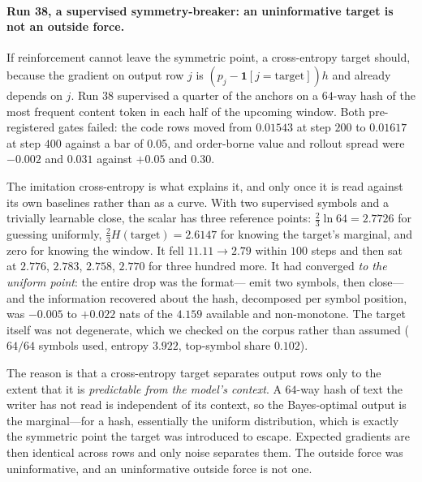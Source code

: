 \documentclass{article} %
\begin{document}
\paragraph{Run 38, a supervised symmetry-breaker: an uninformative target is not an outside force.}
If reinforcement cannot leave the symmetric point, a cross-entropy target should, because the
gradient on output row $j$ is $(p_j - \mathbf{1}[j = \text{target}])h$ and already depends on $j$.
Run 38 supervised a quarter of the anchors on a $64$-way hash of the most frequent content token in
each half of the upcoming window. Both pre-registered gates failed: the code rows moved from
$0.01543$ at step $200$ to $0.01617$ at step $400$ against a bar of $0.05$, and order-borne value
and rollout spread were $-0.002$ and $0.031$ against $+0.05$ and $0.30$.

The imitation cross-entropy is what explains it, and only once it is read against its own baselines
rather than as a curve. With two supervised symbols and a trivially learnable close, the scalar has
three reference points: $\tfrac{2}{3}\ln 64 = 2.7726$ for guessing uniformly, $\tfrac{2}{3}H
(\text{target}) = 2.6147$ for knowing the target's marginal, and zero for knowing the window. It
fell $11.11 \to 2.79$ within $100$ steps and then sat at $2.776$, $2.783$, $2.758$, $2.770$ for
three hundred more. It had converged \emph{to the uniform point}: the entire drop was the format---
emit two symbols, then close---and the information recovered about the hash, decomposed per symbol
position, was $-0.005$ to $+0.022$ nats of the $4.159$ available and non-monotone. The target itself
was not degenerate, which we checked on the corpus rather than assumed ($64/64$ symbols used,
entropy $3.922$, top-symbol share $0.102$).

The reason is that a cross-entropy target separates output rows only to the extent that it is
\emph{predictable from the model's context}. A $64$-way hash of text the writer has not read is
independent of its context, so the Bayes-optimal output is the marginal---for a hash, essentially
the uniform distribution, which is exactly the symmetric point the target was introduced to escape.
Expected gradients are then identical across rows and only noise separates them. The outside force
was uninformative, and an uninformative outside force is not one.
\end{document}
